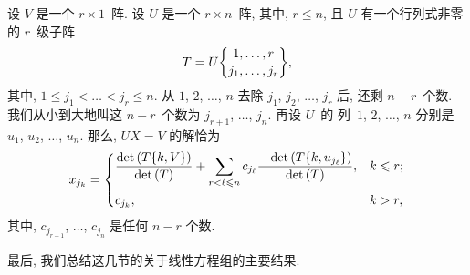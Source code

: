 \documentclass[../libro.tex]{subfiles}
\begin{document}
\begin{theorem}
    设 \(V\) 是一个 \(r \times 1\)~阵.
    设 \(U\) 是一个 \(r \times n\)~阵,
    其中, \(r \leq n\),
    且 \(U\) 有一个行列式非零的 \(r\)~级子阵
    \begin{align*}
        T = U\submat{1,\dots,r}{j_1,\dots,j_r},
    \end{align*}
    其中, \(1 \leq j_1 < \dots < j_r \leq n\).
    从 \(1\), \(2\), \(\dots\), \(n\)
    去除 \(j_1\), \(j_2\), \(\dots\), \(j_r\)
    后, 还剩 \(n - r\)~个数.
    我们从小到大地叫这 \(n - r\)~个数为
    \(j_{r+1}\), \(\dots\), \(j_n\).
    再设 \(U\)~的%
    列~\(1\), \(2\), \(\dots\), \(n\)
    分别是 \(u_1\), \(u_2\), \(\dots\), \(u_n\).
    那么, \(UX = V\) 的解恰为
    \begin{align*}
        x_{j_k} =
        \begin{dcases}
            \frac{\det {(T\{k,V\})}}{\det {(T)}}
            + \sum_{r < \ell \leq n}
            {c_{j_\ell}
            \frac{-\det {(T\{k,u_{j_\ell}\})}}{\det {(T)}}},
            & k \leq r; \\
            c_{j_k},
            & k > r,
        \end{dcases}
    \end{align*}
    其中, \(c_{j_{r+1}}\), \(\dots\), \(c_{j_n}\)
    是任何 \(n-r\) 个数.
\end{theorem}

最后, 我们总结这几节的关于线性方程组的主要结果.
\end{document}
